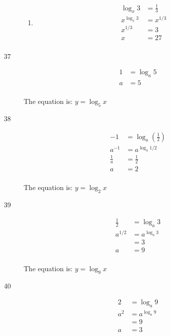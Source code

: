 \documentclass{exam}
\begin{document}
\begin{description}
\begin{enumerate}[a]
        \item 
          \begin{align*}
            \log_x 3     &= \frac{1}{3} \\
            x^{\log_x 3} &= x^{1/3} \\
            x^{1/3}      &= 3 \\
            x            &= 27 \\
          \end{align*}
      \end{enumerate}

    \item[37]
      \begin{align*}
        1 &= \log_a 5 \\
        a &= 5 \\
      \end{align*}

      The equation is: $y = \log_5 x$

    \item[38]
      \begin{align*}
        -1          &= \log_a \left( \frac{1}{2} \right) \\
        a^{-1}      &= a^{\log_a 1/2} \\
        \frac{1}{a} &= \frac{1}{2} \\
        a           &= 2 \\
      \end{align*}

      The equation is: $y = \log_2 x$

    \item[39]
      \begin{align*}
        \frac{1}{2} &= \log_a 3 \\
        a^{1/2}     &= a^{\log_a 3} \\
                    &= 3 \\
        a           &= 9 \\
      \end{align*}

      The equation is: $y = \log_9 x$

    \item[40]
      \begin{align*}
        2   &= \log_a 9 \\
        a^2 &= a^{\log_a 9} \\
            &= 9 \\
        a   &= 3 \\
      \end{align*}


\end{description}
\end{document}
